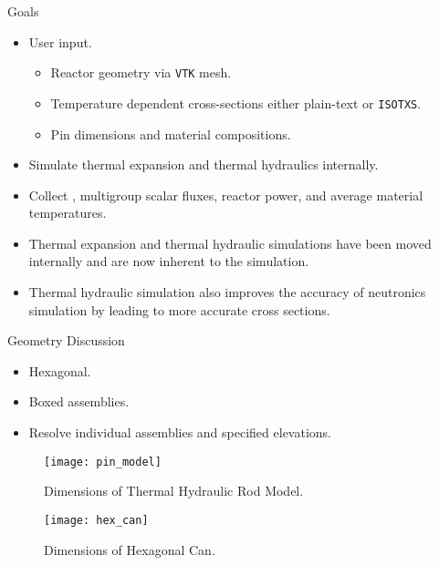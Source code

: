 \begin{frame}{Goals}
  \begin{itemize}
    \item User input.
      \begin{itemize}
        \item Reactor geometry via \texttt{VTK} mesh.
        \item Temperature dependent cross-sections either plain-text or 
          \texttt{ISOTXS}.
        \item Pin dimensions and material compositions.
      \end{itemize}
    \item Simulate thermal expansion and thermal hydraulics internally.
    \item Collect \keff, multigroup scalar fluxes, reactor power, and average
      material temperatures.
  \end{itemize}
  \begin{itemize}
    \item Thermal expansion and thermal hydraulic simulations have been moved
      internally and are now inherent to the simulation.
    \item Thermal hydraulic simulation also improves the accuracy of neutronics
      simulation by leading to more accurate cross sections.
  \end{itemize}
\end{frame}

\begin{frame}{Geometry Discussion}
  \begin{itemize}
    \item Hexagonal.
    \item Boxed assemblies.
    \item Resolve individual assemblies and specified elevations.
  \end{itemize}
\end{frame}

\begin{frame}
  \begin{figure}
    \centering
    \texttt{[image: pin\_model]}
    \caption{Dimensions of Thermal Hydraulic Rod Model.}
    \label{fig:pin_model}
  \end{figure}
\end{frame}

\begin{frame}
  \begin{figure}
    \centering
    \texttt{[image: hex\_can]}
    \caption{Dimensions of Hexagonal Can.}
    \label{fig:hex_can}
  \end{figure}
\end{frame}

